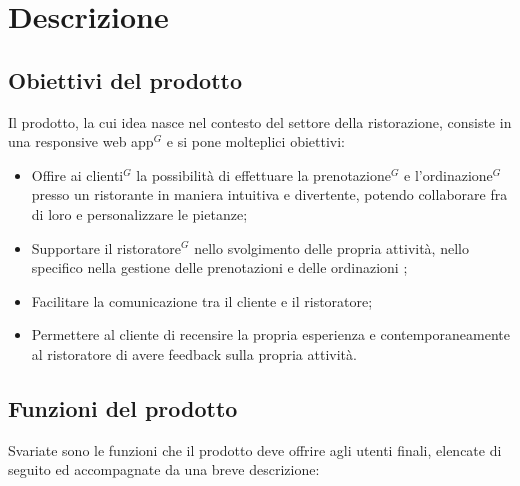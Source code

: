 \section{Descrizione }
\subsection{Obiettivi del prodotto}

Il prodotto, la cui idea nasce nel contesto del settore della ristorazione,
 consiste in una responsive web app$^{G}$ e si pone molteplici obiettivi:
\begin{itemize}
    \item Offire ai clienti$^{G}$ la possibilità di effettuare la prenotazione$^{G}$ e l'ordinazione$^{G}$ presso un ristorante
      in maniera intuitiva e divertente, potendo collaborare fra di loro e personalizzare le pietanze;
    \item Supportare il ristoratore$^{G}$ nello svolgimento delle propria attività, nello specifico nella gestione delle prenotazioni e
    delle ordinazioni ;
    \item Facilitare la comunicazione tra il cliente e il ristoratore;
    \item Permettere al cliente di recensire la propria esperienza e contemporaneamente al ristoratore di avere
    feedback sulla propria attività.
\end{itemize}

\subsection{Funzioni del prodotto}

Svariate sono le funzioni che il prodotto deve offrire agli utenti finali,
elencate di seguito ed accompagnate da una breve descrizione:

